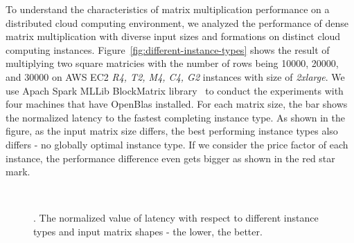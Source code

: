 \documentclass[10pt, conference, compsocconf]{IEEEtran}
\begin{document}
To understand the characteristics of matrix multiplication performance on a distributed cloud computing environment, we analyzed the performance of dense matrix multiplication with diverse input sizes and formations on distinct cloud computing instances. Figure~\ref{fig:different-instance-types} shows the result of multiplying two square matricies with the number of rows being 10000, 20000, and 30000 on AWS EC2 \textit{R4, T2, M4, C4, G2} instances with size of \textit{2xlarge}. We use Apach Spark MLLib BlockMatrix library~\cite{spark-mm} to conduct the experiments with four machines that have OpenBlas installed. For each matrix size, the bar shows the normalized latency to the fastest completing instance type. As shown in the figure, as the input matrix size differs, the best performing instance types also differs - no globally optimal instance type. If we consider the price factor of each instance, the performance difference even gets bigger as shown in the red star mark.

\begin{figure}[!ht]
  \centering
  \\
  \caption{\label{fig:instance-blocks-sizes-compare}. The normalized value of latency with respect to different instance types and input matrix shapes - the lower, the better.}
\end{figure}
\end{document}
